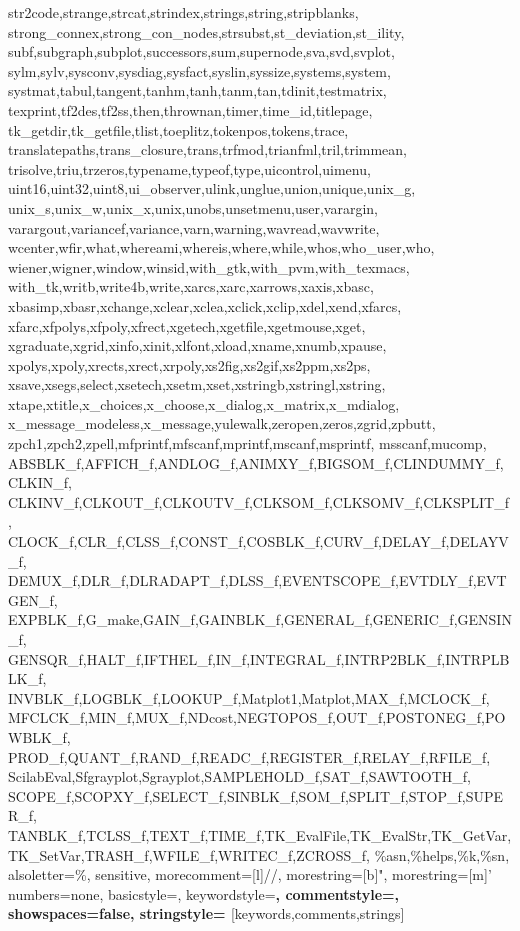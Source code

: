 {{      str2code,strange,strcat,strindex,strings,string,stripblanks,%
      strong_connex,strong_con_nodes,strsubst,st_deviation,st_ility,%
      subf,subgraph,subplot,successors,sum,supernode,sva,svd,svplot,%
      sylm,sylv,sysconv,sysdiag,sysfact,syslin,syssize,systems,system,%
      systmat,tabul,tangent,tanhm,tanh,tanm,tan,tdinit,testmatrix,%
      texprint,tf2des,tf2ss,then,thrownan,timer,time_id,titlepage,%
      tk_getdir,tk_getfile,tlist,toeplitz,tokenpos,tokens,trace,%
      translatepaths,trans_closure,trans,trfmod,trianfml,tril,trimmean,%
      trisolve,triu,trzeros,typename,typeof,type,uicontrol,uimenu,%
      uint16,uint32,uint8,ui_observer,ulink,unglue,union,unique,unix_g,%
      unix_s,unix_w,unix_x,unix,unobs,unsetmenu,user,varargin,%
      varargout,variancef,variance,varn,warning,wavread,wavwrite,%
      wcenter,wfir,what,whereami,whereis,where,while,whos,who_user,who,%
      wiener,wigner,window,winsid,with_gtk,with_pvm,with_texmacs,%
      with_tk,writb,write4b,write,xarcs,xarc,xarrows,xaxis,xbasc,%
      xbasimp,xbasr,xchange,xclear,xclea,xclick,xclip,xdel,xend,xfarcs,%
      xfarc,xfpolys,xfpoly,xfrect,xgetech,xgetfile,xgetmouse,xget,%
      xgraduate,xgrid,xinfo,xinit,xlfont,xload,xname,xnumb,xpause,%
      xpolys,xpoly,xrects,xrect,xrpoly,xs2fig,xs2gif,xs2ppm,xs2ps,%
      xsave,xsegs,select,xsetech,xsetm,xset,xstringb,xstringl,xstring,%
      xtape,xtitle,x_choices,x_choose,x_dialog,x_matrix,x_mdialog,%
      x_message_modeless,x_message,yulewalk,zeropen,zeros,zgrid,zpbutt,%
      zpch1,zpch2,zpell,mfprintf,mfscanf,mprintf,mscanf,msprintf,%
      msscanf,mucomp,%
      ABSBLK_f,AFFICH_f,ANDLOG_f,ANIMXY_f,BIGSOM_f,CLINDUMMY_f,CLKIN_f,%
      CLKINV_f,CLKOUT_f,CLKOUTV_f,CLKSOM_f,CLKSOMV_f,CLKSPLIT_f,%
      CLOCK_f,CLR_f,CLSS_f,CONST_f,COSBLK_f,CURV_f,DELAY_f,DELAYV_f,%
      DEMUX_f,DLR_f,DLRADAPT_f,DLSS_f,EVENTSCOPE_f,EVTDLY_f,EVTGEN_f,%
      EXPBLK_f,G_make,GAIN_f,GAINBLK_f,GENERAL_f,GENERIC_f,GENSIN_f,%
      GENSQR_f,HALT_f,IFTHEL_f,IN_f,INTEGRAL_f,INTRP2BLK_f,INTRPLBLK_f,%
      INVBLK_f,LOGBLK_f,LOOKUP_f,Matplot1,Matplot,MAX_f,MCLOCK_f,%
      MFCLCK_f,MIN_f,MUX_f,NDcost,NEGTOPOS_f,OUT_f,POSTONEG_f,POWBLK_f,%
      PROD_f,QUANT_f,RAND_f,READC_f,REGISTER_f,RELAY_f,RFILE_f,%
      ScilabEval,Sfgrayplot,Sgrayplot,SAMPLEHOLD_f,SAT_f,SAWTOOTH_f,%
      SCOPE_f,SCOPXY_f,SELECT_f,SINBLK_f,SOM_f,SPLIT_f,STOP_f,SUPER_f,%
      TANBLK_f,TCLSS_f,TEXT_f,TIME_f,TK_EvalFile,TK_EvalStr,TK_GetVar,%
      TK_SetVar,TRASH_f,WFILE_f,WRITEC_f,ZCROSS_f,%
      \%asn,\%helps,\%k,\%sn},%
   alsoletter=\%,%
   sensitive,%
   morecomment=[l]//,%
   morestring=[b]",%
   morestring=[m]'%
   numbers=none,%
   basicstyle=\tiny,%
   keywordstyle=\bfseries,%
   commentstyle=\bfseries,%
   showspaces=false,%
   stringstyle=\bfseries
  }[keywords,comments,strings]%

